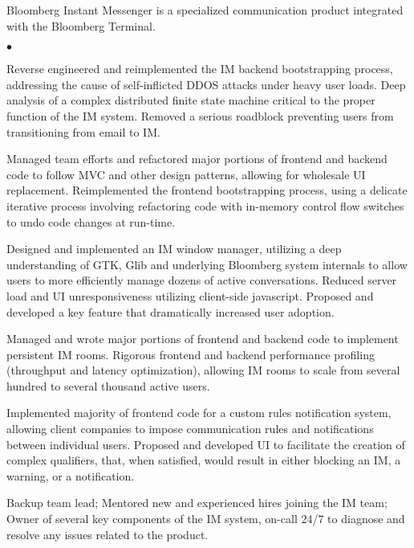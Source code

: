 \documentclass[10pt]{article}
\begin{document}
{\small
\noindent 
Bloomberg Instant Messenger is a specialized communication product integrated with the Bloomberg Terminal. 

\begin{list}{$\bullet$}{}

\item Reverse engineered and reimplemented the IM backend bootstrapping process, addressing the cause of self-inflicted DDOS attacks under heavy user loads.  Deep analysis of a complex distributed finite state machine critical to the proper function of the IM system.  Removed a serious roadblock preventing users from transitioning from email to IM.

\item Managed team efforts and refactored major portions of frontend and backend code to follow MVC and other design patterns, allowing for wholesale UI replacement.  Reimplemented the frontend bootstrapping process, using a delicate iterative process involving refactoring code with in-memory control flow switches to undo code changes at run-time.

\item Designed and implemented an IM window manager, utilizing a deep understanding of GTK, Glib and underlying Bloomberg system internals to allow users to more efficiently manage dozens of active conversations.  Reduced server load and UI unresponsiveness utilizing client-side javascript.  Proposed and developed a key feature that dramatically increased user adoption.

\item Managed and wrote major portions of frontend and backend code to implement persistent IM rooms.  Rigorous frontend and backend performance profiling (throughput and latency optimization), allowing IM rooms to scale from several hundred to several thousand active users. 

\item Implemented majority of frontend code for a custom rules notification system, allowing client companies to impose communication rules and notifications between individual users.  Proposed and developed UI to facilitate the creation of complex qualifiers, that, when satisfied, would result in either blocking an IM, a warning, or a notification.

\item Backup team lead; Mentored new and experienced hires joining the IM team; Owner of several key components of the IM system, on-call 24/7 to diagnose and resolve any issues related to the product.  

\end{list}
}
\end{document}

